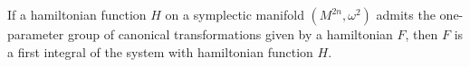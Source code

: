 If a hamiltonian function $H$ on a symplectic manifold $(M^{2n}, \omega^2)$ admits the one-parameter group of canonical transformations given by a hamiltonian $F$, then $F$ is a first integral of the system with hamiltonian function $H$.
